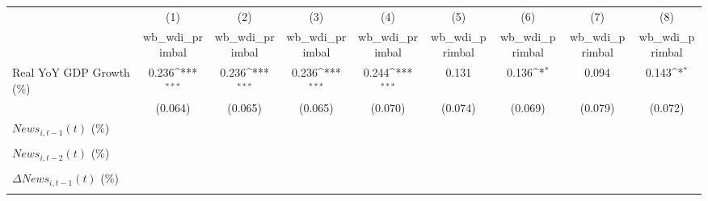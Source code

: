 {
\def\sym#1{\ifmmode^{#1}\else\(^{#1}\)\fi}
\begin{tabular}{l*{8}{c}}
\toprule
                    &\multicolumn{1}{c}{(1)}&\multicolumn{1}{c}{(2)}&\multicolumn{1}{c}{(3)}&\multicolumn{1}{c}{(4)}&\multicolumn{1}{c}{(5)}&\multicolumn{1}{c}{(6)}&\multicolumn{1}{c}{(7)}&\multicolumn{1}{c}{(8)}\\
                    &\multicolumn{1}{c}{wb_wdi_primbal}&\multicolumn{1}{c}{wb_wdi_primbal}&\multicolumn{1}{c}{wb_wdi_primbal}&\multicolumn{1}{c}{wb_wdi_primbal}&\multicolumn{1}{c}{wb_wdi_primbal}&\multicolumn{1}{c}{wb_wdi_primbal}&\multicolumn{1}{c}{wb_wdi_primbal}&\multicolumn{1}{c}{wb_wdi_primbal}\\
\midrule
Real YoY GDP Growth (\%)&       0.236\sym{***}&       0.236\sym{***}&       0.236\sym{***}&       0.244\sym{***}&       0.131         &       0.136\sym{*}  &       0.094         &       0.143\sym{*}  \\
                    &     (0.064)         &     (0.065)         &     (0.065)         &     (0.070)         &     (0.074)         &     (0.069)         &     (0.079)         &     (0.072)         \\
\addlinespace
$ News_{i,t-1}(t)$ (\%)&                     &                     &                     &                     &                     &                     &                     &                     \\
                    &                     &                     &                     &                     &                     &                     &                     &                     \\
\addlinespace
$ News_{i,t-2}(t)$ (\%)&                     &                     &                     &                     &                     &                     &                     &                     \\
                    &                     &                     &                     &                     &                     &                     &                     &                     \\
\addlinespace
$ \Delta News_{i,t-1}(t)$ (\%)&                     &                     &                     &                     &                     &                     &                     &                     \\
                    &                     &                     &                     &                     &                     &                     &                     &                     \\

\end{tabular}}

